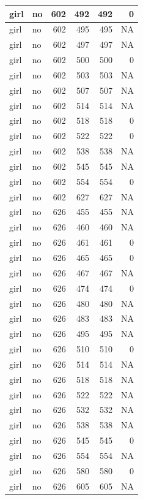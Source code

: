 \documentclass[man]{apa6}
\begin{document}
\begin{tabular}{l|l|r|r|r|r}
\hline
girl & no & 602 & 492 & 492 & 0\\
\hline
girl & no & 602 & 495 & 495 & NA\\
\hline
girl & no & 602 & 497 & 497 & NA\\
\hline
girl & no & 602 & 500 & 500 & 0\\
\hline
girl & no & 602 & 503 & 503 & NA\\
\hline
girl & no & 602 & 507 & 507 & NA\\
\hline
girl & no & 602 & 514 & 514 & NA\\
\hline
girl & no & 602 & 518 & 518 & 0\\
\hline
girl & no & 602 & 522 & 522 & 0\\
\hline
girl & no & 602 & 538 & 538 & NA\\
\hline
girl & no & 602 & 545 & 545 & NA\\
\hline
girl & no & 602 & 554 & 554 & 0\\
\hline
girl & no & 602 & 627 & 627 & NA\\
\hline
girl & no & 626 & 455 & 455 & NA\\
\hline
girl & no & 626 & 460 & 460 & NA\\
\hline
girl & no & 626 & 461 & 461 & 0\\
\hline
girl & no & 626 & 465 & 465 & 0\\
\hline
girl & no & 626 & 467 & 467 & NA\\
\hline
girl & no & 626 & 474 & 474 & 0\\
\hline
girl & no & 626 & 480 & 480 & NA\\
\hline
girl & no & 626 & 483 & 483 & NA\\
\hline
girl & no & 626 & 495 & 495 & NA\\
\hline
girl & no & 626 & 510 & 510 & 0\\
\hline
girl & no & 626 & 514 & 514 & NA\\
\hline
girl & no & 626 & 518 & 518 & NA\\
\hline
girl & no & 626 & 522 & 522 & NA\\
\hline
girl & no & 626 & 532 & 532 & NA\\
\hline
girl & no & 626 & 538 & 538 & NA\\
\hline
girl & no & 626 & 545 & 545 & 0\\
\hline
girl & no & 626 & 554 & 554 & NA\\
\hline
girl & no & 626 & 580 & 580 & 0\\
\hline
girl & no & 626 & 605 & 605 & NA\\

\end{tabular}
\end{document}
